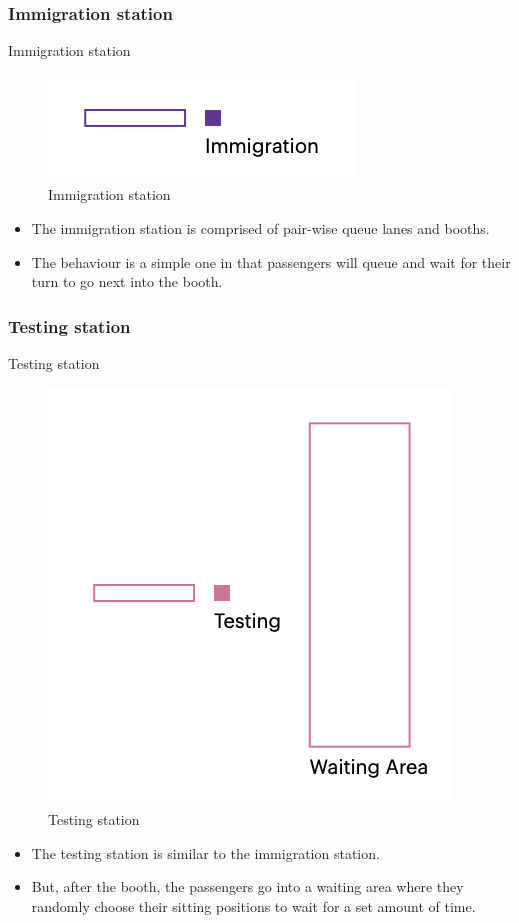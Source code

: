 \documentclass{beamer}
\begin{document}
\subsubsection{Immigration station}
\begin{frame}{Immigration station}
	\begin{figure}
		\includegraphics[scale=1]{../img/immigration}
		\caption{Immigration station}
		
	\end{figure}
	\begin{itemize}
		\item The immigration station is comprised of pair-wise queue lanes and booths.
		\item The behaviour is a simple one in that passengers will queue and wait for their turn to go next into the booth.
	\end{itemize}
\end{frame}

\subsubsection{Testing station}
\begin{frame}{Testing station}
	\begin{figure}
		\includegraphics[scale=0.6]{../img/testing}
		\caption{Testing station}
		
	\end{figure}
	\begin{itemize}
		\item The testing station is similar to the immigration station.
		\item But, after the booth, the passengers go into a waiting area where they randomly choose their sitting positions to wait for a set amount of time.
	\end{itemize}
\end{frame}
\end{document}
